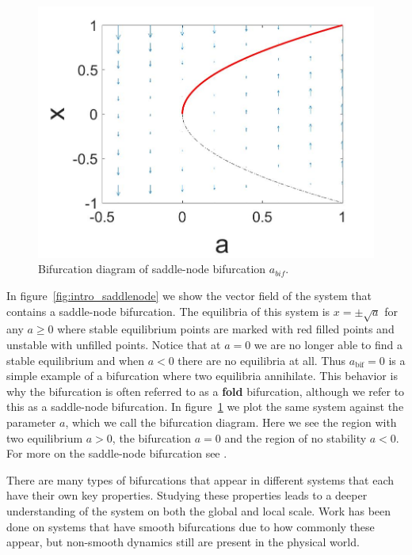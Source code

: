 \begin{figure}[H]
\centering
\includegraphics[width=.7\linewidth]{intro/saddlenode_bif_diagram.jpg}
\caption{Bifurcation diagram of saddle-node bifurcation $a_{bif}$.}
\label{fig:intro_saddlenode_bif_diagram}
\end{figure}

In figure~\ref{fig:intro_saddlenode} we show the vector field of the system that contains a saddle-node bifurcation. The equilibria of this system is $x=\pm \sqrt{a}$ for any $a\ge0$ where stable equilibrium points are marked with red filled points and unstable with unfilled points. Notice that at $a=0$ we are no longer able to find a stable equilibrium and when $a<0$ there are no equilibria at all. Thus $a_{\text{bif}}=0$ is a simple example of a bifurcation where two equilibria annihilate. This behavior is why the bifurcation is often referred to as a \textbf{fold} bifurcation, although we refer to this as a saddle-node bifurcation. In figure~\ref{fig:intro_saddlenode_bif_diagram} we plot the same system against the parameter $a$, which we call the bifurcation diagram. Here we see the region with two equilibrium $a>0$, the bifurcation $a=0$ and the region of no stability $a<0$. For more on the saddle-node bifurcation see \cite{kuznetsov2006saddle}.

There are many types of bifurcations that appear in different systems that each have their own key properties. Studying these properties leads to a deeper understanding of the system on both the global and local scale. Work has been done on systems that have smooth bifurcations due to how commonly these appear, but non-smooth dynamics still are present in the physical world.

